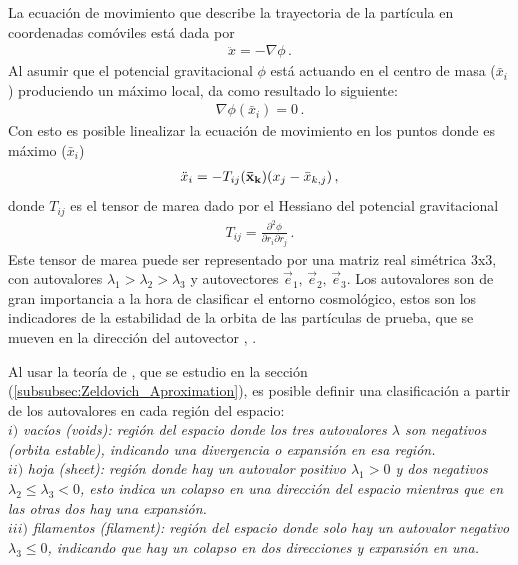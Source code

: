 La ecuación de movimiento que describe la trayectoria de la partícula en coordenadas comóviles está dada por 
\begin{align}
    \ddot{x}=-\nabla\phi\,.
\end{align}
%
Al asumir que el potencial gravitacional $\phi$ está actuando en el centro de masa ($\bar{x}_{i}$) produciendo un máximo local,  da como resultado lo siguiente:
%
\begin{align}
    \nabla\phi(\bar{x}_{i})=0\,.
\end{align}
%
Con esto es posible linealizar la ecuación de movimiento en los puntos donde es máximo ($\bar{x}_{i}$)
%
\begin{align}
    \ddot{x}_{i}=-T_{ij}({\bf{\bar{x}}_{k}})(x_{j}-\bar{x}_{k,j})\,,
\end{align}
%
donde $T_{ij}$ es el tensor de marea dado por el Hessiano del potencial gravitacional
%
\begin{align}
    T_{ij}=\frac{\partial^2 \phi}{\partial r_{i} \partial r_{j}}\,.
\end{align}
%
Este tensor de marea puede ser representado por una matriz real simétrica 3x3, con autovalores $\lambda_{1}>\lambda_{2}>\lambda_{3}$ y  autovectores $\vec{e}_{1},\, \vec{e}_{2},\, \vec{e}_{3}$. Los autovalores son de gran importancia a la hora de clasificar el entorno cosmológico, estos son los indicadores de la estabilidad de la orbita de las partículas de prueba, que se mueven en la dirección del autovector \cite{padmanabhan1995}, \cite{hahn2007}.

Al usar la teoría de \cite{zeldovich1970}, que se estudio en la sección (\ref{subsubsec:Zeldovich_Aproximation}), es posible definir una clasificación a partir de los autovalores en cada región del espacio:\\

$i)$ {\it{vacíos (voids)}: región del espacio donde los tres autovalores $\lambda$ son negativos (orbita estable), indicando una divergencia o expansión en esa región.}\\

$ii)$ {\it{hoja (sheet)}: región donde hay un autovalor positivo $\lambda_{1}>0$ y dos negativos $\lambda_{2} \leq \lambda_{3}< 0$, esto indica un colapso en una dirección del espacio mientras que en las otras dos hay una expansión.}\\

$iii)$ {\it{filamentos (filament)}: región del espacio donde solo hay un autovalor negativo $\lambda_{3}\leq 0$, indicando que hay un colapso en dos direcciones y expansión en una.} \\

